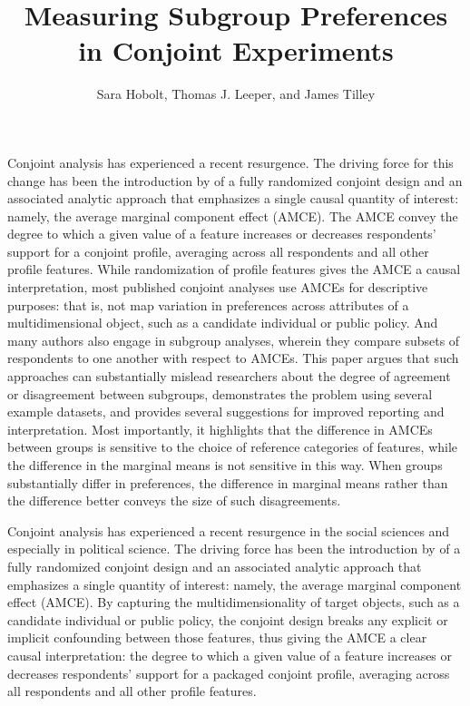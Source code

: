 \documentclass[a4paper,12pt]{article}\usepackage[]{graphicx}\usepackage[]{color}
\title{Measuring Subgroup Preferences in Conjoint Experiments}
\author{Sara Hobolt, Thomas J. Leeper, and James Tilley}
\begin{document}
\maketitle

{\abstract Conjoint analysis has experienced a recent resurgence. The driving force for this change has been the introduction by \citet{HainmuellerHopkinsYamamoto2014} of a fully randomized conjoint design and an associated analytic approach that emphasizes a single causal quantity of interest: namely, the average marginal component effect (AMCE). The AMCE convey the degree to which a given value of a feature increases or decreases respondents' support for a conjoint profile, averaging across all respondents and all other profile features. While randomization of profile features gives the AMCE a causal interpretation, most published conjoint analyses use AMCEs for descriptive purposes: that is, not map variation in preferences across attributes of a multidimensional object, such as a candidate individual or public policy. And many authors also engage in subgroup analyses, wherein they compare subsets of respondents to one another with respect to AMCEs. This paper argues that such approaches can substantially mislead researchers about the degree of agreement or disagreement between subgroups, demonstrates the problem using several example datasets, and provides several suggestions for improved reporting and interpretation. Most importantly, it highlights that the difference in AMCEs between groups is sensitive to the choice of reference categories of features, while the difference in the marginal means is not sensitive in this way. When groups substantially differ in preferences, the difference in marginal means rather than the difference better conveys the size of such disagreements.}






\clearpage


Conjoint analysis has experienced a recent resurgence in the social sciences and especially in political science. The driving force has been the introduction by \citet{HainmuellerHopkinsYamamoto2014} of a fully randomized conjoint design and an associated analytic approach that emphasizes a single quantity of interest: namely, the average marginal component effect (AMCE). By capturing the multidimensionality of target objects, such as a candidate individual or public policy, the conjoint design breaks any explicit or implicit confounding between those features, thus giving the AMCE a clear causal interpretation: the degree to which a given value of a feature increases or decreases respondents' support for a packaged conjoint profile, averaging across all respondents and all other profile features.
\end{document}

